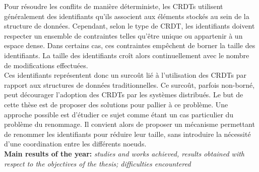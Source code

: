\documentclass[12pt]{article}
\newcommand{\commentaire}[1]{\small\textit{#1}}
\begin{document}
Pour résoudre les conflits de manière déterministe, les \acp{CRDT} utilisent généralement des identifiants qu'ils associent aux éléments stockés au sein de la structure de données.
Cependant, selon le type de \ac{CRDT}, les identifiants doivent respecter un ensemble de contraintes telles qu'être unique ou appartenir à un espace dense.
Dans certains cas, ces contraintes empêchent de borner la taille des identifiants.
La taille des identifiants croît alors continuellement avec le nombre de modifications effectuées.
\\

Ces identifiants représentent donc un surcoût lié à l'utilisation des \acp{CRDT} par rapport aux structures de données traditionnelles.
Ce surcoût, parfois non-borné, peut décourager l'adoption des \acp{CRDT} par les systèmes distribués.
Le but de cette thèse est de proposer des solutions pour pallier à ce problème.
Une approche possible est d'étudier ce sujet comme étant un cas particulier du problème du renommage.
Il convient alors de proposer un mécanisme permettant de renommer les identifiants pour réduire leur taille, sans introduire la nécessité d'une coordination entre les différents noeuds.
\\

\noindent\textbf{Main results of the year:}
\commentaire{%
  studies and works achieved, results obtained with respect to the
  objectives of the thesis; difficulties encountered}
\end{document}
